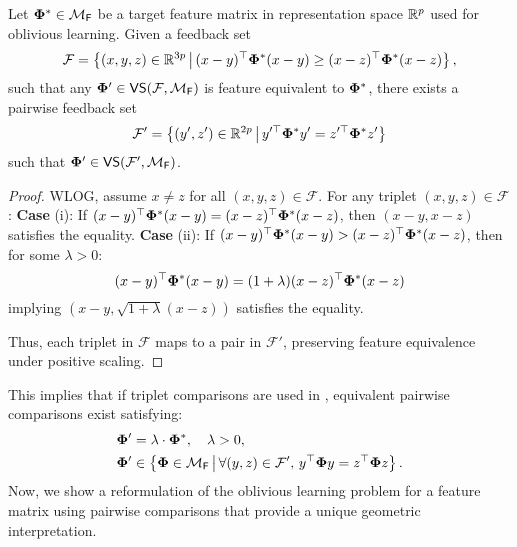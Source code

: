 \begin{lemma}\label{lem: reduction}
Let $\boldsymbol{\Phi}^* \in \mathcal{M}_{\mathsf{F}}$ be a target feature matrix in representation space $\mathbb{R}^p$ used for oblivious learning. Given a feedback set \vspace{-1.5mm}
\[
\mathcal{F} = \left\{ (x, y, z) \in \mathbb{R}^{3p} \,\big|\, (x - y)^{\top} \boldsymbol{\Phi}^* (x - y) \geq (x - z)^{\top} \boldsymbol{\Phi}^* (x - z) \right\},
\]
such that any $\boldsymbol{\Phi}' \in \textsf{VS}(\mathcal{F}, \mathcal{M}_{\mathsf{F}})$ is feature equivalent to $\boldsymbol{\Phi}^*$, there exists a pairwise feedback set \vspace{-1.5mm}
\[
\mathcal{F}' = \left\{ (y', z') \in \mathbb{R}^{2p} \,\big|\, y'^{\top} \boldsymbol{\Phi}^* y' = z'^{\top} \boldsymbol{\Phi}^* z' \right\}
\]
such that $\boldsymbol{\Phi}' \in \textsf{VS}(\mathcal{F}', \mathcal{M}_{\mathsf{F}})$.\vspace{-3mm}
\end{lemma}
\begin{proof}
WLOG, assume $x \neq z$ for all $(x, y, z) \in \mathcal{F}$. For any triplet $(x, y, z) \in \mathcal{F}$: \textbf{Case} (i): If $(x - y)^{\top} \boldsymbol{\Phi}^* (x - y) = (x - z)^{\top} \boldsymbol{\Phi}^* (x - z)$, then $(x - y, x - z)$ satisfies the equality. \textbf{Case} (ii): If $(x - y)^{\top} \boldsymbol{\Phi}^* (x - y) > (x - z)^{\top} \boldsymbol{\Phi}^* (x - z)$, then for some $\lambda > 0$:
\[
(x - y)^{\top} \boldsymbol{\Phi}^* (x - y) = (1 + \lambda)(x - z)^{\top} \boldsymbol{\Phi}^* (x - z)
\]
implying $(x - y, \sqrt{1 + \lambda}(x - z))$ satisfies the equality.

Thus, each triplet in $\mathcal{F}$ maps to a pair in $\mathcal{F}'$, preserving feature equivalence under positive scaling.
\end{proof}
This implies that if triplet comparisons are used in , equivalent pairwise comparisons exist satisfying:\vspace{-5mm}
\begin{subequations}\label{eq: redsol}
\begin{align}
    \boldsymbol{\Phi}' &= \lambda \cdot {\boldsymbol{\Phi}^*}, \quad \lambda > 0, \label{eq:reduction_scaling} \\
    \boldsymbol{\Phi}' &\in \left\{ \boldsymbol{\Phi} \in \mathcal{M}_{\mathsf{F}} \,\big|\, \forall (y, z) \in \mathcal{F}', \, y^{\top} \boldsymbol{\Phi} y = z^{\top} \boldsymbol{\Phi} z \right\}. \label{eq:reduction_solution}
\end{align}
\end{subequations}
Now, we show a reformulation of the oblivious learning problem for a feature matrix using pairwise comparisons that provide a unique geometric interpretation.
